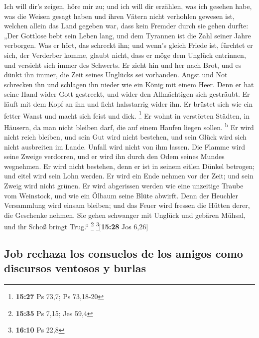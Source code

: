  Ich will dir's zeigen, höre mir zu; und ich will dir
erzählen, was ich gesehen habe,  was die Weisen gesagt
haben und ihren Vätern nicht verhohlen gewesen ist, 
welchen allein das Land gegeben war, dass kein Fremder durch sie gehen
durfte:  „Der Gottlose bebt sein Leben lang, und dem
Tyrannen ist die Zahl seiner Jahre verborgen.  Was er
hört, das schreckt ihn; und wenn's gleich Friede ist, fürchtet er sich,
der Verderber komme,  glaubt nicht, dass er möge dem
Unglück entrinnen, und versieht sich immer des Schwerts. 
Er zieht hin und her nach Brot, und es dünkt ihn immer, die Zeit seines
Unglücks sei vorhanden.  Angst und Not schrecken ihn und
schlagen ihn nieder wie ein König mit einem Heer.  Denn
er hat seine Hand wider Gott gestreckt, und wider den Allmächtigen sich
gesträubt.  Er läuft mit dem Kopf an ihn und ficht
halsstarrig wider ihn.  Er brüstet sich wie ein fetter
Wanst und macht sich feist und dick. \footnote{\textbf{15:27} Ps 73,7;
  Ps 73,18-20}  Er wohnt in verstörten Städten, in
Häusern, da man nicht bleiben darf, die auf einem Haufen liegen sollen.
\textsuperscript{b}  Er wird nicht reich bleiben, und
sein Gut wird nicht bestehen, und sein Glück wird sich nicht ausbreiten
im Lande.  Unfall wird nicht von ihm lassen. Die Flamme
wird seine Zweige verdorren, und er wird ihn durch den Odem seines
Mundes wegnehmen.  Er wird nicht bestehen, denn er ist in
seinem eitlen Dünkel betrogen; und eitel wird sein Lohn werden.
 Er wird ein Ende nehmen vor der Zeit; und sein Zweig
wird nicht grünen.  Er wird abgerissen werden wie eine
unzeitige Traube vom Weinstock, und wie ein Ölbaum seine Blüte abwirft.
 Denn der Heuchler Versammlung wird einsam bleiben; und
das Feuer wird fressen die Hütten derer, die Geschenke nehmen.
 Sie gehen schwanger mit Unglück und gebären Mühsal, und
ihr Schoß bringt Trug.`` \footnote{\textbf{15:35} Ps 7,15; Jes 59,4}
\footnote{\textbf{16:10} Ps 22,8}{[}\textbf{15:28} Jos 6,26{]}

\hypertarget{job-rechaza-los-consuelos-de-los-amigos-como-discursos-ventosos-y-burlas}{%
\subsection{Job rechaza los consuelos de los amigos como discursos
ventosos y
burlas}\label{job-rechaza-los-consuelos-de-los-amigos-como-discursos-ventosos-y-burlas}}

